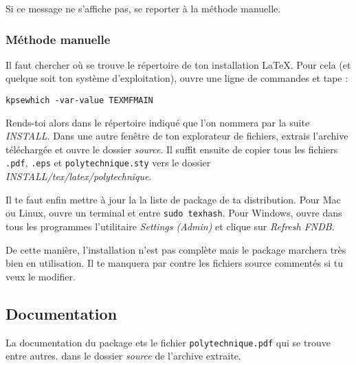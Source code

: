 \documentclass[a4paper,12pt,twoside]{article}
\begin{document}
Si ce message ne s'affiche pas, se reporter à la méthode manuelle.
\subsubsection{Méthode manuelle}

Il faut chercher où se trouve le répertoire de ton installation LaTeX. Pour cela (et quelque soit ton système d'exploitation), ouvre une ligne de commandes et tape :
\begin{verbatim}
kpsewhich -var-value TEXMFMAIN
\end{verbatim}
Rends-toi alors dans le répertoire indiqué que l'on nommera par la suite \emph{INSTALL}. Dans une autre fenêtre de ton explorateur de fichiers, extrais l'archive téléchargée et ouvre le dossier \emph{source}. Il suffit ensuite de copier tous les fichiers \texttt{.pdf}, \texttt{.eps} et \texttt{polytechnique.sty} vers le dossier \emph{INSTALL/tex/latex/polytechnique}. 

Il te faut enfin mettre à jour la la liste de package de ta distribution. Pour Mac ou Linux, ouvre un terminal et entre \texttt{sudo texhash}. Pour Windows, ouvre dans tous les programmes l'utilitaire \emph{Settings (Admin)} et clique sur \emph{Refresh FNDB}.

De cette manière, l'installation n'est pas complète mais le package marchera très bien en utilisation. Il te manquera par contre les fichiers source commentés si tu veux le modifier.

\subsection{Documentation}

La documentation du package ets le fichier \texttt{polytechnique.pdf} qui se trouve entre autres. dans le dossier \emph{source} de l'archive extraite.
\end{document}
